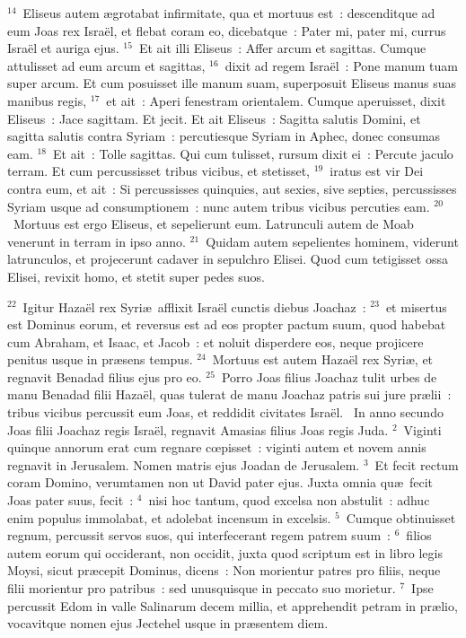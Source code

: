 ${}^{14}$~Eliseus autem \ae grotabat infirmitate, qua et mortuus est~: descenditque ad eum Joas rex Isra\"el, et flebat coram eo, dicebatque~: Pater mi, pater mi, currus Isra\"el et auriga ejus.
${}^{15}$~Et ait illi Eliseus~: Affer arcum et sagittas. Cumque attulisset ad eum arcum et sagittas,
${}^{16}$~dixit ad regem Isra\"el~: Pone manum tuam super arcum. Et cum posuisset ille manum suam, superposuit Eliseus manus suas manibus regis,
${}^{17}$~et ait~: Aperi fenestram orientalem. Cumque aperuisset, dixit Eliseus~: Jace sagittam. Et jecit. Et ait Eliseus~: Sagitta salutis Domini, et sagitta salutis contra Syriam~: percutiesque Syriam in Aphec, donec consumas eam.
${}^{18}$~Et ait~: Tolle sagittas. Qui cum tulisset, rursum dixit ei~: Percute jaculo terram. Et cum percussisset tribus vicibus, et stetisset,
${}^{19}$~iratus est vir Dei contra eum, et ait~: Si percussisses quinquies, aut sexies, sive septies, percussisses Syriam usque ad consumptionem~: nunc autem tribus vicibus percuties eam.
${}^{20}$~Mortuus est ergo Eliseus, et sepelierunt eum. Latrunculi autem de Moab venerunt in terram in ipso anno.
${}^{21}$~Quidam autem sepelientes hominem, viderunt latrunculos, et projecerunt cadaver in sepulchro Elisei. Quod cum tetigisset ossa Elisei, revixit homo, et stetit super pedes suos.


${}^{22}$~Igitur Haza\"el rex Syri\ae\ afflixit Isra\"el cunctis diebus Joachaz~:
${}^{23}$~et misertus est Dominus eorum, et reversus est ad eos propter pactum suum, quod habebat cum Abraham, et Isaac, et Jacob~: et noluit disperdere eos, neque projicere penitus usque in pr\ae sens tempus.
${}^{24}$~Mortuus est autem Haza\"el rex Syri\ae , et regnavit Benadad filius ejus pro eo.
${}^{25}$~Porro Joas filius Joachaz tulit urbes de manu Benadad filii Haza\"el, quas tulerat de manu Joachaz patris sui jure pr\ae lii~: tribus vicibus percussit eum Joas, et reddidit civitates Isra\"el.
~In anno secundo Joas filii Joachaz regis Isra\"el, regnavit Amasias filius Joas regis Juda.
${}^{2}$~Viginti quinque annorum erat cum regnare cœpisset~: viginti autem et novem annis regnavit in Jerusalem. Nomen matris ejus Joadan de Jerusalem.
${}^{3}$~Et fecit rectum coram Domino, verumtamen non ut David pater ejus. Juxta omnia qu\ae\ fecit Joas pater suus, fecit~:
${}^{4}$~nisi hoc tantum, quod excelsa non abstulit~: adhuc enim populus immolabat, et adolebat incensum in excelsis.
${}^{5}$~Cumque obtinuisset regnum, percussit servos suos, qui interfecerant regem patrem suum~:
${}^{6}$~filios autem eorum qui occiderant, non occidit, juxta quod scriptum est in libro legis Moysi, sicut pr\ae cepit Dominus, dicens~: Non morientur patres pro filiis, neque filii morientur pro patribus~: sed unusquisque in peccato suo morietur.
${}^{7}$~Ipse percussit Edom in valle Salinarum decem millia, et apprehendit petram in pr\ae lio, vocavitque nomen ejus Jectehel usque in pr\ae sentem diem.


